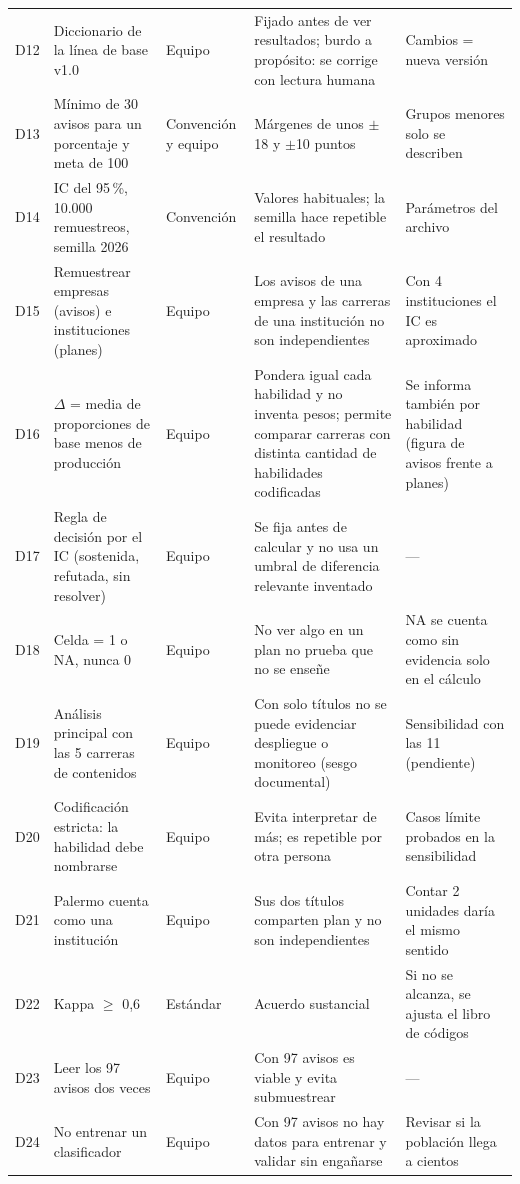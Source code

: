 \documentclass[11pt,a4paper]{article}
\renewcommand{\ge}{\ensuremath{\geq}}
\begin{document}
\begin{footnotesize}
\begin{longtable}{@{}c L{2.9cm} L{1.9cm} L{4.6cm} L{3.4cm}@{}}
D12 & Diccionario de la línea de base v1.0 & Equipo & Fijado antes de ver resultados; burdo a propósito: se corrige con lectura humana & Cambios = nueva versión\\
D13 & Mínimo de 30 avisos para un porcentaje y meta de 100 & Convención y equipo & Márgenes de unos $\pm$18 y $\pm$10 puntos \cite{brown2001} & Grupos menores solo se describen\\
D14 & IC del 95\,\%, 10.000 remuestreos, semilla 2026 & Convención & Valores habituales; la semilla hace repetible el resultado & Parámetros del archivo\\
D15 & Remuestrear empresas (avisos) e instituciones (planes) & Equipo & Los avisos de una empresa y las carreras de una institución no son independientes \cite{efron1979} & Con 4 instituciones el IC es aproximado\\
D16 & $\Delta$ = media de proporciones de base menos de producción & Equipo & Pondera igual cada habilidad y no inventa pesos; permite comparar carreras con distinta cantidad de habilidades codificadas & Se informa también por habilidad (figura de avisos frente a planes)\\
D17 & Regla de decisión por el IC (sostenida, refutada, sin resolver) & Equipo & Se fija antes de calcular y no usa un umbral de diferencia relevante inventado & ---\\
D18 & Celda = 1 o NA, nunca 0 & Equipo & No ver algo en un plan no prueba que no se enseñe & NA se cuenta como sin evidencia solo en el cálculo\\
D19 & Análisis principal con las 5 carreras de contenidos & Equipo & Con solo títulos no se puede evidenciar despliegue o monitoreo (sesgo documental) & Sensibilidad con las 11 (pendiente)\\
D20 & Codificación estricta: la habilidad debe nombrarse & Equipo & Evita interpretar de más; es repetible por otra persona & Casos límite probados en la sensibilidad\\
D21 & Palermo cuenta como una institución & Equipo & Sus dos títulos comparten plan y no son independientes & Contar 2 unidades daría el mismo sentido\\
D22 & Kappa $\ge$ 0,6 & Estándar & Acuerdo sustancial \cite{landis1977} & Si no se alcanza, se ajusta el libro de códigos\\
D23 & Leer los 97 avisos dos veces & Equipo & Con 97 avisos es viable y evita submuestrear & ---\\
D24 & No entrenar un clasificador & Equipo & Con 97 avisos no hay datos para entrenar y validar sin engañarse & Revisar si la población llega a cientos\\

\end{longtable}
\end{footnotesize}
\end{document}
